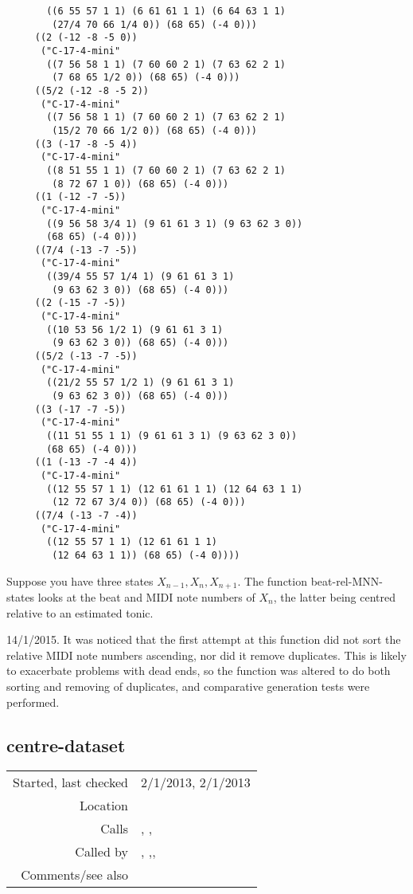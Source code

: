 \begin{verbatim}
       ((6 55 57 1 1) (6 61 61 1 1) (6 64 63 1 1)
        (27/4 70 66 1/4 0)) (68 65) (-4 0)))
     ((2 (-12 -8 -5 0))
      ("C-17-4-mini"
       ((7 56 58 1 1) (7 60 60 2 1) (7 63 62 2 1)
        (7 68 65 1/2 0)) (68 65) (-4 0)))
     ((5/2 (-12 -8 -5 2))
      ("C-17-4-mini"
       ((7 56 58 1 1) (7 60 60 2 1) (7 63 62 2 1)
        (15/2 70 66 1/2 0)) (68 65) (-4 0)))
     ((3 (-17 -8 -5 4))
      ("C-17-4-mini"
       ((8 51 55 1 1) (7 60 60 2 1) (7 63 62 2 1)
        (8 72 67 1 0)) (68 65) (-4 0)))
     ((1 (-12 -7 -5))
      ("C-17-4-mini"
       ((9 56 58 3/4 1) (9 61 61 3 1) (9 63 62 3 0))
       (68 65) (-4 0)))
     ((7/4 (-13 -7 -5))
      ("C-17-4-mini"
       ((39/4 55 57 1/4 1) (9 61 61 3 1)
        (9 63 62 3 0)) (68 65) (-4 0)))
     ((2 (-15 -7 -5))
      ("C-17-4-mini"
       ((10 53 56 1/2 1) (9 61 61 3 1)
        (9 63 62 3 0)) (68 65) (-4 0)))
     ((5/2 (-13 -7 -5))
      ("C-17-4-mini"
       ((21/2 55 57 1/2 1) (9 61 61 3 1)
        (9 63 62 3 0)) (68 65) (-4 0)))
     ((3 (-17 -7 -5))
      ("C-17-4-mini"
       ((11 51 55 1 1) (9 61 61 3 1) (9 63 62 3 0))
       (68 65) (-4 0)))
     ((1 (-13 -7 -4 4))
      ("C-17-4-mini"
       ((12 55 57 1 1) (12 61 61 1 1) (12 64 63 1 1)
        (12 72 67 3/4 0)) (68 65) (-4 0)))
     ((7/4 (-13 -7 -4))
      ("C-17-4-mini"
       ((12 55 57 1 1) (12 61 61 1 1)
        (12 64 63 1 1)) (68 65) (-4 0))))
\end{verbatim}

\noindent Suppose you have three states $X_{n-1},
X_n, X_{n+1}$. The function beat-rel-MNN-states
looks at the beat and MIDI note numbers of $X_n$,
the latter being centred relative to an estimated
tonic.

14/1/2015. It was noticed that the first attempt at
this function did not sort the relative MIDI note
numbers ascending, nor did it remove duplicates. This
is likely to exacerbate problems with dead ends, so
the function was altered to do both sorting and
removing of duplicates, and comparative generation
tests were performed.


\subsection*{centre-dataset}\label{fun:centre-dataset}

\vspace{0.3cm}
\begin{tabular}{r|p{8cm}}
Started, last checked & 2/1/2013, 2/1/2013 \\
Location & \nameref{sec:beat-rel-MNN-states} \\
Calls & \nameref{fun:add-to-list}, \nameref{fun:fifth-steps-mode2MNN-MPN},\newline \nameref{fun:min-argmin} \\
Called by & \nameref{fun:beat-MNN-states}, \nameref{fun:beat-MNNs-states},\newline \nameref{fun:beat-rel-MNN-states}, \nameref{fun:HarmAn->roman} \\
Comments/see also &
\end{tabular}

